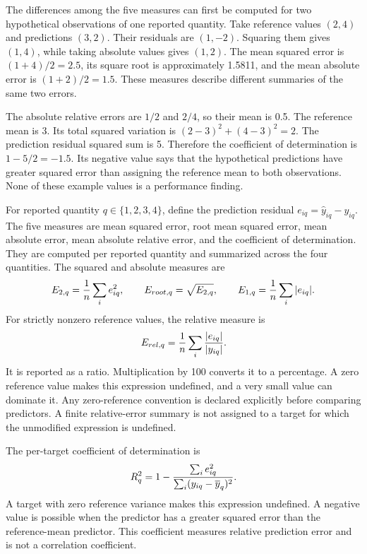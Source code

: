 The differences among the five measures can first be computed for two hypothetical observations of one reported quantity. Take reference values \((2,4)\) and predictions \((3,2)\). Their residuals are \((1,-2)\). Squaring them gives \((1,4)\), while taking absolute values gives \((1,2)\). The mean squared error is \((1+4)/2=2.5\), its square root is approximately 1.5811, and the mean absolute error is \((1+2)/2=1.5\). These measures describe different summaries of the same two errors.

The absolute relative errors are \(1/2\) and \(2/4\), so their mean is 0.5. The reference mean is 3. Its total squared variation is \((2-3)^2+(4-3)^2=2\). The prediction residual squared sum is 5. Therefore the coefficient of determination is \(1-5/2=-1.5\). Its negative value says that the hypothetical predictions have greater squared error than assigning the reference mean to both observations. None of these example values is a performance finding.

For reported quantity \(q\in\{1,2,3,4\}\), define the prediction residual \(e_{iq}=\widehat y_{iq}-y_{iq}\). The five measures are mean squared error, root mean squared error, mean absolute error, mean absolute relative error, and the coefficient of determination. They are computed per reported quantity and summarized across the four quantities. The squared and absolute measures are
\begin{equation}
\equationname{Per-composite squared, root, and absolute error measures}
\label{eq:icsor_composite_error_metrics}
E_{2,q}=\frac{1}{n}\sum_i e_{iq}^{2},
\qquad E_{root,q}=\sqrt{E_{2,q}},
\qquad E_{1,q}=\frac{1}{n}\sum_i|e_{iq}|.
\end{equation}
For strictly nonzero reference values, the relative measure is
\begin{equation}
\equationname{Mean relative absolute error of a reported composite}
\label{eq:icsor_relative_error}
E_{rel,q}=\frac{1}{n}\sum_i\frac{|e_{iq}|}{|y_{iq}|}.
\end{equation}
It is reported as a ratio. Multiplication by 100 converts it to a percentage. A zero reference value makes this expression undefined, and a very small value can dominate it. Any zero-reference convention is declared explicitly before comparing predictors. A finite relative-error summary is not assigned to a target for which the unmodified expression is undefined.

The per-target coefficient of determination is
\begin{equation}
\equationname{Coefficient of determination for a reported composite}
\label{eq:icsor_coefficient_determination}
R_q^2=1-
\frac{\sum_i e_{iq}^{2}}
{\sum_i(y_{iq}-\overline y_q)^2}.
\end{equation}
A target with zero reference variance makes this expression undefined. A negative value is possible when the predictor has a greater squared error than the reference-mean predictor. This coefficient measures relative prediction error and is not a correlation coefficient.

